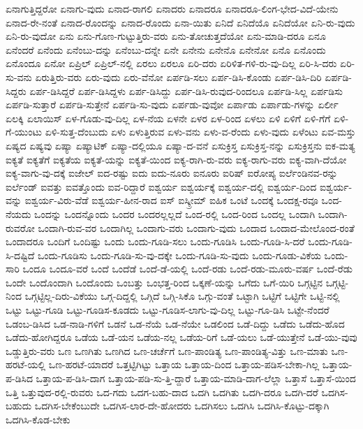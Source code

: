 {ಏನಾಗುತ್ತಿದ್ದರೋ
ಏನಾಗು-ವುದು
ಏನಾದ-ರಾಗಲಿ
ಏನಾದರು
ಏನಾದರೂ
ಏನಾದರೂ-ಲಿಂಗ-ಭೇದ-ವಿದೆ-ಯೇನು
ಏನಾದ-ರೇ-ನಂತೆ
ಏನಾದ-ರೊಂದನ್ನು
ಏನಾದ-ರೊಂದು
ಏನಾ-ಯಿತು
ಏನಿದೆ
ಏನಿದೆಯೊ
ಏನಿದೆಯೋ
ಏನಿ-ರು-ವುದು
ಏನಿ-ರು-ವುದೋ
ಏನು
ಏನು-ಗೊಣ-ಗುಟ್ಟುತ್ತಿರು-ವರು
ಏನು-ತೋಚುತ್ತದೆಯೋ
ಏನು-ಮಾಡಿ-ದರೂ
ಏನೂ
ಏನೆಂದರೆ
ಏನೆಂದು
ಏನೆಂಬು-ದನ್ನು
ಏನೆಂಬು-ದನ್ನೇ
ಏನೇ
ಏನೇನು
ಏನೇನೊ
ಏನೇನೋ
ಏನೊ
ಏನೊಂದು
ಏನೊಂದೂ
ಏನೋ
ಏಪ್ರಿಲ್
ಏಪ್ರಿಲ್-ನಲ್ಲಿ
ಏರಲು
ಏರಲೂ
ಏರಿ-ದರು
ಏರಿಳಿತ-ಗಳಿ-ರು-ವು-ದಿಲ್ಲ
ಏರಿ-ಸಿ-ದರು
ಏರಿ-ಸು-ವನು
ಏರುತ್ತಿರು-ವರು
ಏರು-ವುದು
ಏರು-ವೆನೋ
ಏರ್ಪಡಿ-ಸಲು
ಏರ್ಪ-ಡಿಸಿ-ಕೊಂಡು
ಏರ್ಪ-ಡಿಸಿ-ದಿರಿ
ಏರ್ಪಡಿ-ಸಿದ್ದರು
ಏರ್ಪ-ಡಿಸಿದ್ದರೆ
ಏರ್ಪ-ಡಿಸಿದ್ದಳು
ಏರ್ಪ-ಡಿಸಿದ್ದು
ಏರ್ಪ-ಡಿಸಿ-ರುವುದ-ರಿಂದಲೂ
ಏರ್ಪಡಿ-ಸಿಲ್ಲ
ಏರ್ಪಡಿಸು
ಏರ್ಪಡಿ-ಸುತ್ತಾರೆ
ಏರ್ಪಡಿ-ಸುತ್ತೇನೆ
ಏರ್ಪಡಿ-ಸು-ವುದು
ಏರ್ಪಡು-ವುವೋ
ಏರ್ಪಾಡು
ಏರ್ಪಾಡು-ಗಳನ್ನು
ಏರ್ಲೀ
ಏಲಕ್ಕಿ
ಏಲಾಯಿಸ್
ಏಳ-ಗೊಡು-ವು-ದಿಲ್ಲ
ಏಳ-ನೆಯ
ಏಳನೇ
ಏಳರ
ಏಳ-ರಿಂದ
ಏಳಲು
ಏಳಿ
ಏಳಿಗೆ
ಏಳಿ-ಗೆಗೆ
ಏಳಿ-ಗೆ-ಯುಂಟು
ಏಳಿ-ಸುತ್ತ-ದೆಂಬುದು
ಏಳು
ಏಳುತ್ತಿರುವ
ಏಳು-ವನು
ಏಳು-ವ-ರೆಂದು
ಏಳು-ವುದು
ಏಳೆಂಟು
ಏವ-ಮಸ್ತು
ಏಷ್ಯದ
ಏಷ್ಯವು
ಏಷ್ಯಾ
ಏಷ್ಯಾಟಿಕ್
ಏಷ್ಯಾ-ದಲ್ಲಿಯೂ
ಏಷ್ಯಾ-ದ-ವನೆ
ಏಸುಕ್ರಿಸ್ತ
ಏಸುಕ್ರಿಸ್ತ-ನನ್ನು
ಏಸುಕ್ರಿಸ್ತನು
ಐಕ-ಮತ್ಯ
ಐಕ್ಯತೆ
ಐಕ್ಯತೆಗೆ
ಐಕ್ಯತೆಯ
ಐಕ್ಯತೆ-ಯನ್ನು
ಐಕ್ಯತೆ-ಯಿಂದ
ಐಕ್ಯ-ರಾಗಿ-ರು-ವರು
ಐಕ್ಯ-ರಾಗು-ವರು
ಐಕ್ಯ-ವಾಗಿ-ದೆಯೋ
ಐಕ್ಯ-ವಾಗು-ವು-ದಕ್ಕೆ
ಐಜೇಲ್
ಐದ-ರಷ್ಟು
ಐದು
ಐದು-ನೂರು
ಐನೂರು
ಐರಿಷ್
ಐರೋಪ್ಯ
ಐರ್ಲೆಂಡಿನವ-ರನ್ನು
ಐರ್ಲೆಂಡ್
ಐವತ್ತು
ಐವತ್ತೊಂದು
ಐವ-ರಿದ್ದಾರೆ
ಐಶ್ವರ್ಯ
ಐಶ್ವರ್ಯಕ್ಕೆ
ಐಶ್ವರ್ಯ-ದಲ್ಲಿ
ಐಶ್ವರ್ಯ-ದಿಂದ
ಐಶ್ವರ್ಯ-ವನ್ನು
ಐಶ್ವರ್ಯ-ವಿರು-ವೆಡೆ
ಐಶ್ವರ್ಯ-ಹೀನ-ರಾದ
ಐಸ್
ಐಸ್ಕ್ರೀಮ್
ಐಹಿಕ
ಒಂಟೆ
ಒಂದಕ್ಕೆ
ಒಂದಕ್ಷ-ರವೂ
ಒಂದ-ನೆಯದು
ಒಂದನ್ನು
ಒಂದನ್ನೊಂದು
ಒಂದರ
ಒಂದರಲ್ಲಲ್ಲದೆ
ಒಂದ-ರಲ್ಲಿ
ಒಂದ-ರಿಂದ
ಒಂದಲ್ಲ
ಒಂದಾಗಿ
ಒಂದಾಗಿ-ರುವರೋ
ಒಂದಾಗಿ-ರುವ-ವರ
ಒಂದಾಗಿಲ್ಲ
ಒಂದಾಗು-ವರು
ಒಂದಾಗು-ವುದು
ಒಂದಾದ
ಒಂದಾದ-ಮೇಲೊಂದ-ರಂತೆ
ಒಂದಾದರೂ
ಒಂದಿಗೆ
ಒಂದಿಷ್ಟು
ಒಂದು
ಒಂದು-ಗೂಡಿ-ಸಲು
ಒಂದು-ಗೂಡಿಸಿ
ಒಂದು-ಗೂಡಿ-ಸಿ-ದರೆ
ಒಂದು-ಗೂಡಿ-ಸಿ-ದಷ್ಟಿದೆ
ಒಂದು-ಗೂಡಿಸು
ಒಂದು-ಗೂಡಿ-ಸು-ವು-ದಕ್ಕೇ
ಒಂದು-ಗೂಡಿ-ಸು-ವುದು
ಒಂದು-ಗೂಡು-ವಿಕೆಯ
ಒಂದು-ಸಾರಿ
ಒಂದೂ
ಒಂದೂ-ವರೆ
ಒಂದೆ
ಒಂದೆಡೆ
ಒಂದೆ-ಡೆ-ಯಲ್ಲಿ
ಒಂದೆ-ರಡು
ಒಂದೆ-ರಡು-ಮೂರು-ವರ್ಷ
ಒಂದೆ-ರೆಡು
ಒಂದೇ
ಒಂದೊಂದಾಗಿ
ಒಂದೊಂದು
ಒಂಬತ್ತು
ಒಂಭತ್ತ-ರಿಂದ
ಒಕ್ಕಣೆ-ಯನ್ನು
ಒಗೆದು
ಒಗೆ-ಯಿರಿ
ಒಗ್ಗಟ್ಟಿನ
ಒಗ್ಗಟ್ಟಿ-ನಿಂದ
ಒಗ್ಗಟ್ಟಿಲ್ಲ-ದಿರು-ವಿಕೆಯು
ಒಗ್ಗ-ದಿದ್ದಲ್ಲಿ
ಒಗ್ಗಿದೆ
ಒಗ್ಗಿ-ಸಿಕೊ
ಒಗ್ಗು-ವಂತೆ
ಒಟ್ಟಾಗಿ
ಒಟ್ಟಿಗೆ
ಒಟ್ಟಿಗೇ
ಒಟ್ಟಿ-ನಲ್ಲಿ
ಒಟ್ಟು
ಒಟ್ಟು-ಗೂಡಿ
ಒಟ್ಟು-ಗೂಡಿಸ-ಕೂಡದು
ಒಟ್ಟು-ಗೂಡಿಸ-ಲಾಗು-ವು-ದಿಲ್ಲ
ಒಟ್ಟು-ಗೂ-ಡಿಸಿ
ಒಟ್ಟೇ-ನೆಂದರೆ
ಒಡಂಬ-ಡಿಸಿದ
ಒಡ-ನಾಡಿ-ಗಳಿಗೆ
ಒಡನೆ
ಒಡ-ನೆಯೆ
ಒಡ-ನೆಯೇ
ಒಡಲಿಂದ
ಒಡೆ-ದಿದ್ದು
ಒಡೆದು
ಒಡೆದು-ಹೊದ
ಒಡೆದು-ಹೋಗಿದ್ದರೂ
ಒಡೆಯ
ಒಡೆ-ಯನ
ಒಡೆಯ-ನಲ್ಲ
ಒಡೆಯ-ರಿಗೆ
ಒಡೆ-ಯಲು
ಒಡೆ-ಯುತ್ತೇನೆ
ಒಡೆ-ಯು-ವುವು
ಒಡ್ಡುತ್ತಿರು-ವರು
ಒಣ
ಒಣಗಿತು
ಒಣಗಿದ
ಒಣ-ಚರ್ಚೆಗೆ
ಒಣ-ಪಾಂಡಿತ್ಯ
ಒಣ-ಪಾಂಡಿತ್ಯ-ವಿತ್ತು
ಒಣ-ಮಾತು
ಒಣ-ಹರಟೆ-ಯಲ್ಲಿ
ಒಣ-ಹರಟೆ-ಯಾದರೆ
ಒತ್ತಟ್ಟಿಗಿಟ್ಟು
ಒತ್ತಾಯ
ಒತ್ತಾಯ-ದಿಂದ
ಒತ್ತಾಯ-ಪಡಿಸ-ಬೇಕಾ-ಗಿಲ್ಲ
ಒತ್ತಾಯ-ಪ-ಡಿಸಿದ
ಒತ್ತಾಯ-ಪ-ಡಿಸಿ-ದಾಗ
ಒತ್ತಾಯ-ಪಡಿ-ಸು-ತ್ತಿ-ದ್ದಾರೆ
ಒತ್ತಾಯ-ಮಾಡಿ-ದಾಗ-ಲೆಲ್ಲಾ
ಒತ್ತಾಸೆ
ಒತ್ತಾಸೆ-ಯಿಂದ
ಒತ್ತಿ
ಒತ್ತುವುದ-ರಲ್ಲಿ-ರುವರು
ಒದ-ಗದು
ಒದಗ-ಬಹು-ದಾದ
ಒದಗಿ
ಒದಗಿತು
ಒದಗಿ-ದರೂ
ಒದಗಿ-ದರೆ
ಒದಗಿಸ-ಬಹುದು
ಒದಗಿಸ-ಬೇಕೆಂಬುದೇ
ಒದಗಿಸ-ಲಾರ-ದೇ-ಹೋದರು
ಒದಗಿಸಲು
ಒದಗಿಸಿ
ಒದಗಿಸಿ-ಕೊಟ್ಟು-ದಕ್ಕಾಗಿ
ಒದಗಿಸಿ-ಕೊಡ-ಬೇಕು
}

